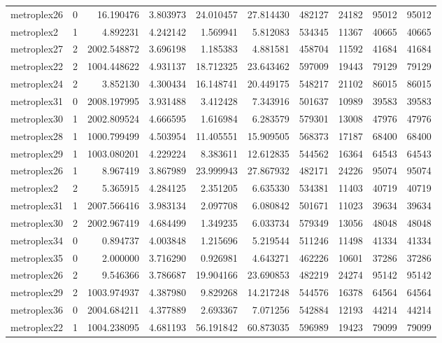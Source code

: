\begin{longtable}{|l|r|r|r|r|r|r|r|r|r|}
metroplex26 & 0 & 16.190476 & 3.803973 & 24.010457 & 27.814430 & 482127 & 24182 & 95012 & 95012 \\
metroplex2 & 1 & 4.892231 & 4.242142 & 1.569941 & 5.812083 & 534345 & 11367 & 40665 & 40665 \\
metroplex27 & 2 & 2002.548872 & 3.696198 & 1.185383 & 4.881581 & 458704 & 11592 & 41684 & 41684 \\
metroplex22 & 2 & 1004.448622 & 4.931137 & 18.712325 & 23.643462 & 597009 & 19443 & 79129 & 79129 \\
metroplex24 & 2 & 3.852130 & 4.300434 & 16.148741 & 20.449175 & 548217 & 21102 & 86015 & 86015 \\
metroplex31 & 0 & 2008.197995 & 3.931488 & 3.412428 & 7.343916 & 501637 & 10989 & 39583 & 39583 \\
metroplex30 & 1 & 2002.809524 & 4.666595 & 1.616984 & 6.283579 & 579301 & 13008 & 47976 & 47976 \\
metroplex28 & 1 & 1000.799499 & 4.503954 & 11.405551 & 15.909505 & 568373 & 17187 & 68400 & 68400 \\
metroplex29 & 1 & 1003.080201 & 4.229224 & 8.383611 & 12.612835 & 544562 & 16364 & 64543 & 64543 \\
metroplex26 & 1 & 8.967419 & 3.867989 & 23.999943 & 27.867932 & 482171 & 24226 & 95074 & 95074 \\
metroplex2 & 2 & 5.365915 & 4.284125 & 2.351205 & 6.635330 & 534381 & 11403 & 40719 & 40719 \\
metroplex31 & 1 & 2007.566416 & 3.983134 & 2.097708 & 6.080842 & 501671 & 11023 & 39634 & 39634 \\
metroplex30 & 2 & 2002.967419 & 4.684499 & 1.349235 & 6.033734 & 579349 & 13056 & 48048 & 48048 \\
metroplex34 & 0 & 0.894737 & 4.003848 & 1.215696 & 5.219544 & 511246 & 11498 & 41334 & 41334 \\
metroplex35 & 0 & 2.000000 & 3.716290 & 0.926981 & 4.643271 & 462226 & 10601 & 37286 & 37286 \\
metroplex26 & 2 & 9.546366 & 3.786687 & 19.904166 & 23.690853 & 482219 & 24274 & 95142 & 95142 \\
metroplex29 & 2 & 1003.974937 & 4.387980 & 9.829268 & 14.217248 & 544576 & 16378 & 64564 & 64564 \\
metroplex36 & 0 & 2004.684211 & 4.377889 & 2.693367 & 7.071256 & 542884 & 12193 & 44214 & 44214 \\
metroplex22 & 1 & 1004.238095 & 4.681193 & 56.191842 & 60.873035 & 596989 & 19423 & 79099 & 79099 \\

\end{longtable}

